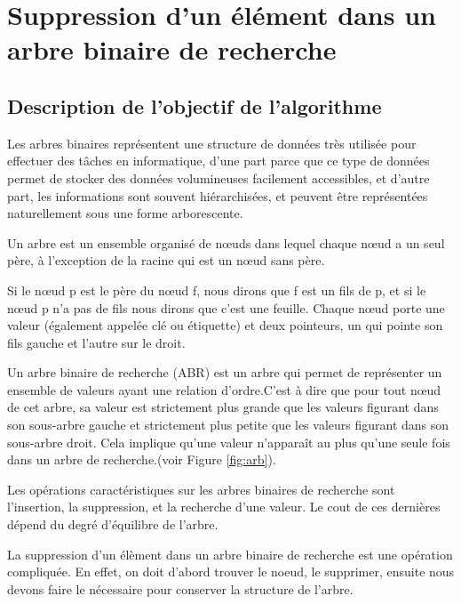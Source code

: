 \chapter{Suppression d'un élément dans un arbre binaire de recherche}

\section{Description de l'objectif de l'algorithme}
Les arbres binaires représentent une structure de données très utilisée pour effectuer des tâches en informatique, d’une part parce que ce type de données permet de stocker des données volumineuses facilement accessibles, et d’autre part, les informations sont souvent hiérarchisées, et peuvent être représentées naturellement sous une forme arborescente.
\par
Un arbre est un ensemble organisé de nœuds dans lequel chaque nœud a un seul père, à l’exception de la racine qui est un nœud sans père. 
\par
 Si le nœud p est le père du nœud f, nous dirons que f est un fils de p, et si le nœud p n’a pas de fils nous dirons que c’est une feuille. Chaque nœud porte une valeur (également appelée clé ou étiquette) et deux pointeurs, un qui pointe son fils gauche et l’autre sur le droit.  
 \par
 Un arbre binaire de recherche (ABR) est un arbre qui permet de représenter un ensemble de valeurs ayant une relation d’ordre.C'est à dire que pour tout nœud de cet arbre, sa valeur est strictement plus grande que les valeurs figurant dans son sous-arbre gauche et strictement plus petite que les valeurs figurant dans son sous-arbre droit. Cela implique qu’une valeur n’apparaît au plus qu’une seule fois dans un arbre de recherche.(voir Figure \ref{fig:arb}).
 \par
 Les opérations caractéristiques sur les arbres binaires de recherche sont l’insertion, la suppression, et la recherche d’une valeur. Le cout de ces dernières dépend du degré d’équilibre de l’arbre. 
 \par 
 La suppression d'un élèment dans un arbre binaire de recherche est une opération compliquée. En effet, on doit d'abord trouver le noeud, le supprimer, ensuite nous devons faire le nécessaire pour conserver la structure de l'arbre.  


